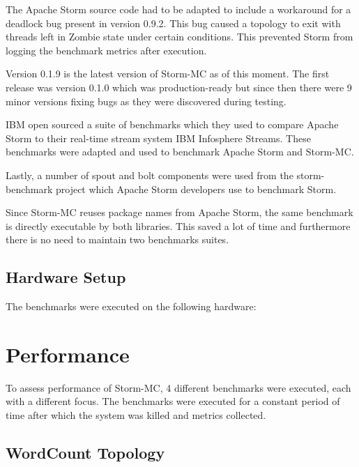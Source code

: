 The Apache Storm source code had to be adapted to include a workaround for a deadlock bug present in version 0.9.2. This bug caused a topology to exit with threads left in Zombie state under certain conditions. This prevented Storm from logging the benchmark metrics after execution.

Version 0.1.9 is the latest version of Storm-MC as of this moment. The first release was version 0.1.0 which was production-ready but since then there were 9 minor versions fixing bugs as they were discovered during testing.

IBM open sourced a suite of benchmarks which they used to compare Apache Storm to their real-time stream system IBM Infosphere Streams. These benchmarks were adapted and used to benchmark Apache Storm and Storm-MC.

Lastly, a number of spout and bolt components were used from the storm-benchmark project which Apache Storm developers use to benchmark Storm.

Since Storm-MC reuses package names from Apache Storm, the same benchmark is directly executable by both libraries. This saved a lot of time and furthermore there is no need to maintain two benchmarks suites.


\subsection{Hardware Setup}

The benchmarks were executed on the following hardware:


\section{Performance}
\label{sec:performance}


To assess performance of Storm-MC, 4 different benchmarks were executed, each with a different focus. The benchmarks were executed for a constant period of time after which the system was killed and metrics collected.

\subsection{WordCount Topology}

